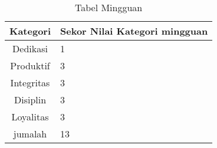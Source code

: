 \begin{table}[h]
\begin{center}
\caption{Tabel Mingguan}
\begin{tabular}{|c|l|}
\hline
Kategori& Sekor Nilai Kategori mingguan\\
\hline
Dedikasi & 1\\
\hline
Produktif & 3\\
\hline
Integritas & 3\\
\hline
Disiplin & 3\\
\hline
Loyalitas & 3\\
\hline
jumalah & 13\\
\hline
\end{tabular}
\end{center}
\label {Tabel:contoh} 
\end{table}

